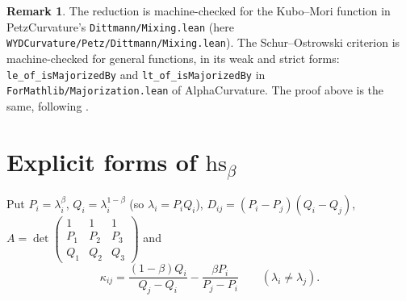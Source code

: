 \documentclass[11pt]{amsart}
\theoremstyle{definition}
\newtheorem{remark}[theorem]{Remark}
\numberwithin{equation}{section}
\newcommand{\hs}{\mathrm{hs}}
\begin{document}
\begin{remark}
The reduction is machine-checked for the Kubo--Mori function in PetzCurvature's
\texttt{Dittmann/Mixing.lean} (here \texttt{WYDCurvature/Petz/Dittmann/Mixing.lean}). The Schur--Ostrowski criterion is machine-checked for general functions, in its weak and strict forms:
\texttt{le\_of\_isMajorizedBy} and \texttt{lt\_of\_isMajorizedBy} in
\texttt{ForMathlib/Majorization.lean} of AlphaCurvature. The proof above is the same, following \cite{dittmann}.
\end{remark}

\section{Explicit forms of \texorpdfstring{$\hs_\beta$}{hs}}\label{sec:forms}

Put $P_i=\lambda_i^\beta$, $Q_i=\lambda_i^{1-\beta}$ (so $\lambda_i=P_iQ_i$), $D_{ij}=(P_i-P_j)(Q_i-Q_j)$, $A=\det\begin{pmatrix}1&1&1\\P_1&P_2&P_3\\Q_1&Q_2&Q_3\end{pmatrix}$ and
\[\kappa_{ij}=\frac{(1-\beta)Q_i}{Q_j-Q_i}-\frac{\beta P_i}{P_j-P_i}\qquad(\lambda_i\ne\lambda_j).\]
\end{document}

